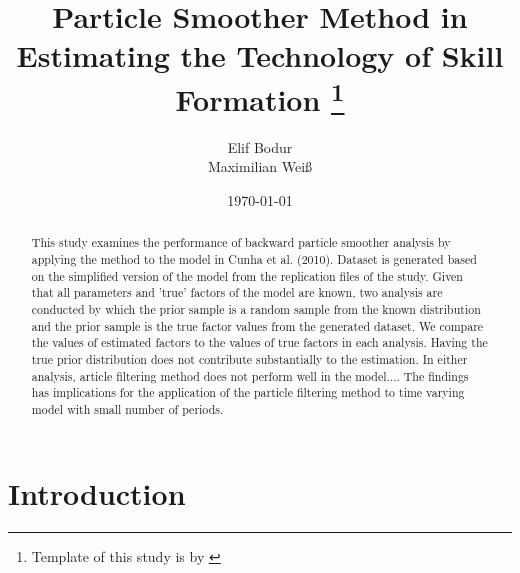 \documentclass[11pt, a4paper, leqno]{article}
\begin{document}
\title{Particle Smoother Method in Estimating the Technology of Skill Formation  \thanks{Template of this study is by \citep{GaudeckerEconProjectTemplates}}}

\author{Elif Bodur \\ Maximilian Weiß}

\date{
\today
}

\maketitle


\begin{abstract}
	This study examines the performance of backward particle smoother analysis by applying the method to the model in Cunha et al. (2010). \nocite{cunha2010} Dataset is generated based on the simplified version of the model from the replication files of the study. Given that all parameters and 'true'  factors of the model are known, two analysis are conducted by which the prior sample is a random sample from the known distribution and the prior sample is the true factor values from the generated dataset. We compare the values of estimated factors to the values of true factors in each analysis. Having the true prior distribution does not contribute substantially to the estimation. In either analysis, article filtering method does not perform well in the model.... The findings has implications for the application of the particle filtering method to time varying model with small number of periods. 
\end{abstract}
\clearpage

\section{Introduction} %
\label{sec:introduction}
\end{document}
